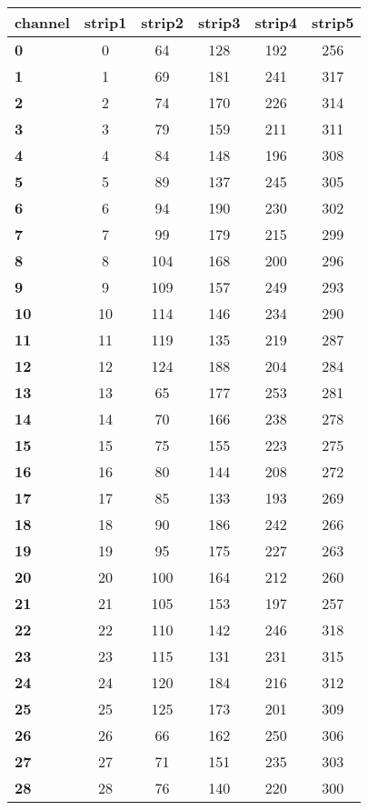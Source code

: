 \begin{longtable}{|l|c|c|c|c|c|}
  \hline
  \textbf{channel} & strip1 & strip2 & strip3 & strip4 & strip5 \\
  \hline
  \textbf{0} & 0 & 64 & 128 & 192 & 256 \\
  \textbf{1} & 1 & 69 & 181 & 241 & 317 \\
  \textbf{2} & 2 & 74 & 170 & 226 & 314 \\
  \textbf{3} & 3 & 79 & 159 & 211 & 311 \\
  \textbf{4} & 4 & 84 & 148 & 196 & 308 \\
  \textbf{5} & 5 & 89 & 137 & 245 & 305 \\
  \textbf{6} & 6 & 94 & 190 & 230 & 302 \\
  \textbf{7} & 7 & 99 & 179 & 215 & 299 \\
  \textbf{8} & 8 & 104 & 168 & 200 & 296 \\
  \textbf{9} & 9 & 109 & 157 & 249 & 293 \\
  \textbf{10} & 10 & 114 & 146 & 234 & 290 \\
  \textbf{11} & 11 & 119 & 135 & 219 & 287 \\
  \textbf{12} & 12 & 124 & 188 & 204 & 284 \\
  \textbf{13} & 13 & 65 & 177 & 253 & 281 \\
  \textbf{14} & 14 & 70 & 166 & 238 & 278 \\
  \textbf{15} & 15 & 75 & 155 & 223 & 275 \\
  \textbf{16} & 16 & 80 & 144 & 208 & 272 \\
  \textbf{17} & 17 & 85 & 133 & 193 & 269 \\
  \textbf{18} & 18 & 90 & 186 & 242 & 266 \\
  \textbf{19} & 19 & 95 & 175 & 227 & 263 \\
  \textbf{20} & 20 & 100 & 164 & 212 & 260 \\
  \textbf{21} & 21 & 105 & 153 & 197 & 257 \\
  \textbf{22} & 22 & 110 & 142 & 246 & 318 \\
  \textbf{23} & 23 & 115 & 131 & 231 & 315 \\
  \textbf{24} & 24 & 120 & 184 & 216 & 312 \\
  \textbf{25} & 25 & 125 & 173 & 201 & 309 \\
  \textbf{26} & 26 & 66 & 162 & 250 & 306 \\
  \textbf{27} & 27 & 71 & 151 & 235 & 303 \\
  \textbf{28} & 28 & 76 & 140 & 220 & 300 \\

\end{longtable}
